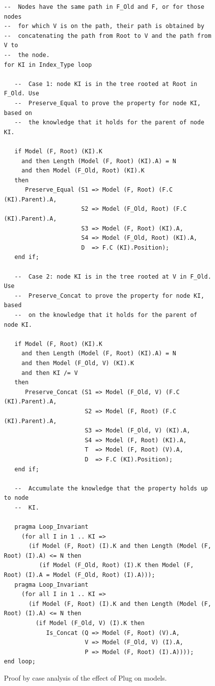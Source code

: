 \documentclass[11pt,a4paper]{article}
\begin{document}
\begin{figure}
\begin{small}
\begin{lstlisting}
--  Nodes have the same path in F_Old and F, or for those nodes
--  for which V is on the path, their path is obtained by
--  concatenating the path from Root to V and the path from V to
--  the node.
for KI in Index_Type loop

   --  Case 1: node KI is in the tree rooted at Root in F_Old. Use
   --  Preserve_Equal to prove the property for node KI, based on
   --  the knowledge that it holds for the parent of node KI.

   if Model (F, Root) (KI).K
     and then Length (Model (F, Root) (KI).A) = N
     and then Model (F_Old, Root) (KI).K
   then
      Preserve_Equal (S1 => Model (F, Root) (F.C (KI).Parent).A,
                      S2 => Model (F_Old, Root) (F.C (KI).Parent).A,
                      S3 => Model (F, Root) (KI).A,
                      S4 => Model (F_Old, Root) (KI).A,
                      D  => F.C (KI).Position);
   end if;

   --  Case 2: node KI is in the tree rooted at V in F_Old. Use
   --  Preserve_Concat to prove the property for node KI, based
   --  on the knowledge that it holds for the parent of node KI.

   if Model (F, Root) (KI).K
     and then Length (Model (F, Root) (KI).A) = N
     and then Model (F_Old, V) (KI).K
     and then KI /= V
   then
      Preserve_Concat (S1 => Model (F_Old, V) (F.C (KI).Parent).A,
                       S2 => Model (F, Root) (F.C (KI).Parent).A,
                       S3 => Model (F_Old, V) (KI).A,
                       S4 => Model (F, Root) (KI).A,
                       T  => Model (F, Root) (V).A,
                       D  => F.C (KI).Position);
   end if;

   --  Accumulate the knowledge that the property holds up to node
   --  KI.

   pragma Loop_Invariant
     (for all I in 1 .. KI =>
       (if Model (F, Root) (I).K and then Length (Model (F, Root) (I).A) <= N then
          (if Model (F_Old, Root) (I).K then Model (F, Root) (I).A = Model (F_Old, Root) (I).A)));
   pragma Loop_Invariant
     (for all I in 1 .. KI =>
       (if Model (F, Root) (I).K and then Length (Model (F, Root) (I).A) <= N then
         (if Model (F_Old, V) (I).K then
            Is_Concat (Q => Model (F, Root) (V).A,
                       V => Model (F_Old, V) (I).A,
                       P => Model (F, Root) (I).A))));
end loop;
\end{lstlisting}
\end{small}
\caption{\label{fig-proof-ca} Proof by case analysis of the effect of Plug on models.}
\end{figure}
\end{document}
